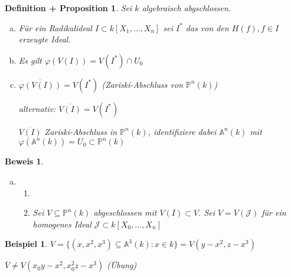 \documentclass[a4paper, 12pt, numbers=noendperiod, chapterprefix=true, headsepline]{scrbook}
\theoremstyle{break}
\newtheorem{DefProp}[Def]{Definition + Proposition}
\theoremstyle{nonumberbreak}
\newtheorem{nnBsp}{Beispiel}
\newtheorem{Bew}{Beweis}
\theoremstyle{nonumberplain}
\newcommand{\quot}[1]{\textrm{\glqq}{#1}\textrm{\grqq}}
\newenvironment{twosidedproofeq}{\begin{enumerate}[\quot{$\subseteq$}:]}{\end{enumerate}}
\newcommand{\proofsubseteq}{\item[\quot{$\subseteq$}:]}
\newcommand{\proofsupseteq}{\item[\quot{$\supseteq$}:]}
\newcommand{\A}{\mathbb{A}}
\newcommand{\IP}{\mathbb{P}}%
\newcommand{\calJ}{\mathcal{J}}
\begin{document}
\begin{DefProp}
Sei $k$ algebraisch abgschlossen.\begin{enumerate}[a)]
\item
	F\"ur ein Radikalideal $I\subset k[X_1,\ldots ,X_n]$ sei $I^*$ das von den $H(f),f\in I$ erzeugte Ideal.

\item
	Es gilt $\varphi(V(I))=V(I^*)\cap U_0$

\item
	$\overline{\varphi(V(I))}=V(I^*)$ (Zariski-Abschluss von $\IP^n(k)$)
	
	\emph{alternativ:} $\overline{V(I)}=V(I^*)$
	
	$\overline{V(I)}$ Zariski-Abschluss in $\IP^n(k)$, identifiziere dabei $\A^n(k)$ mit $\varphi(\A^n(k))=U_0\subset\IP^n(k)$
\end{enumerate}\end{DefProp}

\begin{Bew}\begin{enumerate}[a)]\item[c)]\begin{twosidedproofeq}\proofsubseteq \checkmark \proofsupseteq
Sei $V\subseteq\IP^n(k)$ abgeschlossen mit $V(I)\subset V$. Sei $V=V(\calJ)$ f\"ur ein homogenes Ideal $\calJ\subset k[X_0,\ldots ,X_n]$
\end{twosidedproofeq}\end{enumerate}\end{Bew}

\begin{nnBsp}
$V=\{(x,x^2,x^3)\subseteq\A^3(k) : x\in k\}=V(y-x^2, z-x^3)$

$\overline V \ne V(x_0y-x^2,x_0^2z-x^3)$ (\"Ubung)
\end{nnBsp}
\end{document}
